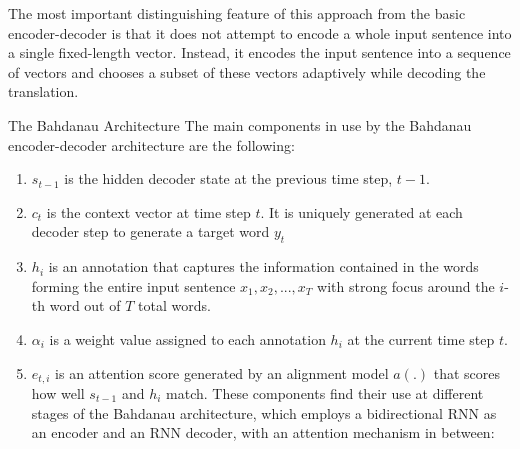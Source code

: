 \documentclass[10pt,a4paper]{article}
\begin{document}
The most important distinguishing feature of this approach from the basic encoder-decoder is that it does not attempt to encode a whole input sentence into a single fixed-length vector. Instead, it encodes the input sentence into a sequence of vectors and chooses a subset of these vectors adaptively while decoding the translation.

The Bahdanau Architecture
The main components in use by the Bahdanau encoder-decoder architecture are the following:
\begin{enumerate}
\item $s_{t-1}$ is the hidden decoder state at the previous time step, $t-1$.
\item $c_{t}$ is the context vector at time step $t$. It is uniquely generated at each decoder step to generate a target word $y_{t}$
\item $h_{i}$ is an annotation that captures the information contained in the words forming the entire input sentence ${x_{1}, x_{2}, ..., x_{T}}$
 with strong focus around the $i$-th word out of $T$ total words. 
\item $\alpha_{i}$ is a weight value assigned to each annotation $h_{i}$ at the current time step $t$.
\item $e_{t, i}$ is an attention score generated by an alignment model $a(.)$ that scores how well $s_{t-1}$ and $h_{i}$ match.
These components find their use at different stages of the Bahdanau architecture, which employs a bidirectional RNN as an encoder and an RNN decoder, with an attention mechanism in between:
\end{enumerate}
\end{document}

